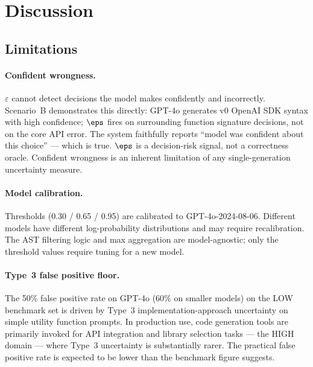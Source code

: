 \section{Discussion}
\label{sec:discussion}

\subsection{Limitations}

\paragraph{Confident wrongness.}
$\varepsilon$ cannot detect decisions the model makes confidently and incorrectly.
Scenario~B demonstrates this directly: GPT-4o generates v0 OpenAI SDK syntax
with high confidence; $\eps$ fires on surrounding function signature decisions,
not on the core API error. The system faithfully reports ``model was confident
about this choice'' --- which is true. $\eps$ is a decision-risk signal, not a
correctness oracle. Confident wrongness is an inherent limitation of any
single-generation uncertainty measure.

\paragraph{Model calibration.}
Thresholds (0.30 / 0.65 / 0.95) are calibrated to GPT-4o-2024-08-06.
Different models have different log-probability distributions and may require
recalibration. The AST filtering logic and max aggregation are model-agnostic;
only the threshold values require tuning for a new model.

\paragraph{Type~3 false positive floor.}
The 50\% false positive rate on GPT-4o (60\% on smaller models) on the LOW benchmark set is driven by
Type~3 implementation-approach uncertainty on simple utility function prompts.
In production use, code generation tools are primarily invoked for API
integration and library selection tasks --- the HIGH domain --- where Type~3
uncertainty is substantially rarer. The practical false positive rate is
expected to be lower than the benchmark figure suggests.

